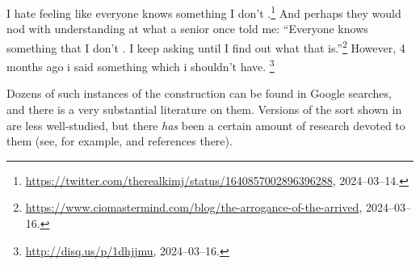 \documentclass[output=paper,colorlinks,citecolor=brown]{langscibook}
\begin{document}
\begin{exe}
 \ex\label{antecDel}
  \begin{xlist}
 \ex\label{}
    I hate feeling like everyone knows something I don't {\gp}\xspace
    .\footnote{\url{https://twitter.com/therealkimj/status/1640857002896396288}, 2024--03--14.}
 \ex\label{antecDel_a}
    And perhaps they would nod with understanding at what a senior
  once told me: ``Everyone knows something that I don't {\gp}\xspace . I keep
  asking until I find out what that is.''\footnote{
  \url{https://www.ciomastermind.com/blog/the-arrogance-of-the-arrived},
  2024--03--16.}
 \ex\label{}
    However, 4 months ago i said something which i shouldn't have. \footnote{
    \url{http://disq.us/p/1dhjjmu}, 2024--03--16.}

  \end{xlist}
\end{exe}
Dozens of such instances of the construction can be found in Google
searches, and there is a very substantial literature on them. Versions
of the sort shown in  are less well-studied, but
there \emph{has} been a certain amount of research devoted to them (see, for example,
\citet{schuyler2002} and references there).
\end{document}
